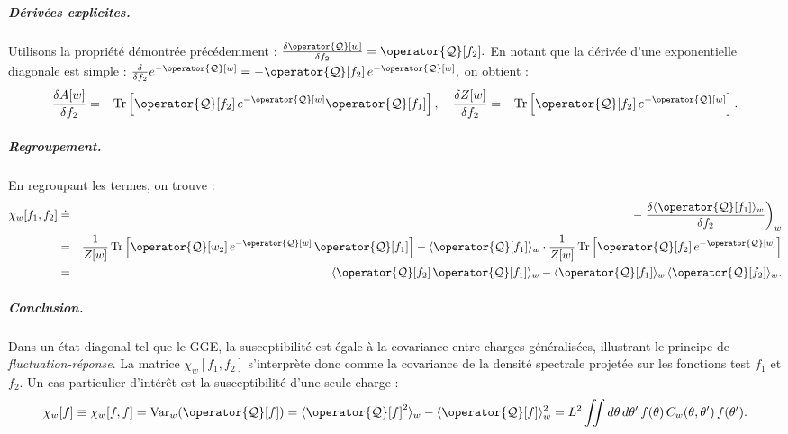 \subparagraph{Dérivées explicites.}
Utilisons la propriété démontrée précédemment :
\(
	\frac{\delta \operator{\mathcal{Q}}[w]}{\delta f_2} = \operator{\mathcal{Q}}[f_2]	.
\)
En notant que la dérivée d’une exponentielle diagonale est simple :
\(
\frac{\delta}{\delta f_2} e^{-\operator{\mathcal{Q}}[w]} = - \operator{\mathcal{Q}}[f_2]\, e^{-\operator{\mathcal{Q}}[w]},
\)
on obtient :
\begin{eqnarray*}
\frac{\delta A[w]}{\delta f_2} = - \mathrm{Tr}\left[ \operator{\mathcal{Q}}[f_2]\, e^{-\operator{\mathcal{Q}}[w]} \operator{\mathcal{Q}}[f_1] \right],
\quad
\frac{\delta Z[w]}{\delta f_2} = - \mathrm{Tr}\left[ \operator{\mathcal{Q}}[f_2]\, e^{-\operator{\mathcal{Q}}[w]} \right].
\end{eqnarray*}

\subparagraph{Regroupement.}
En regroupant les termes, on trouve :
\begin{eqnarray*}
	\chi_w[f_1, f_2]&  \doteq & - \left.\frac{\delta \langle \operator{\mathcal{Q}}[f_1] \rangle_w}{\delta f_2} \right )_w  \\
&=& \frac{1}{Z[w]}\, \mathrm{Tr}\left[ \operator{\mathcal{Q}}[w_2]\, e^{-\operator{\mathcal{Q}}[w]}\, \operator{\mathcal{Q}}[f_1] \right]
- \langle \operator{\mathcal{Q}}[f_1] \rangle_w \cdot \frac{1}{Z[w]}\, \mathrm{Tr}\left[ \operator{\mathcal{Q}}[f_2]\, e^{-\operator{\mathcal{Q}}[w]} \right] \\
&=& \langle \operator{\mathcal{Q}}[f_2]\, \operator{\mathcal{Q}}[f_1] \rangle_w - \langle \operator{\mathcal{Q}}[f_1] \rangle_w\, \langle \operator{\mathcal{Q}}[f_2] \rangle_w.
\end{eqnarray*}

\medskip

\subparagraph{Conclusion.} Dans un état diagonal tel que le GGE, la susceptibilité est égale à la covariance entre charges généralisées, illustrant le principe de \emph{fluctuation-réponse}.
La matrice $\chi_w[f_1, f_2]$ s’interprète donc comme la covariance de la densité spectrale projetée sur les fonctions test $f_1$ et $f_2$.
Un cas particulier d’intérêt est la susceptibilité d’une seule charge :
\begin{eqnarray*}
\chi_w[f] \equiv \chi_w[f, f] = \mathrm{Var}_w(\operator{\mathcal{Q}}[f]) = \langle \operator{\mathcal{Q}}[f]^2 \rangle_w - \langle \operator{\mathcal{Q}}[f] \rangle_w^2
= L^2 \iint d\theta\, d\theta'\, f(\theta)\, C_w(\theta, \theta')\, f(\theta').
\end{eqnarray*}


